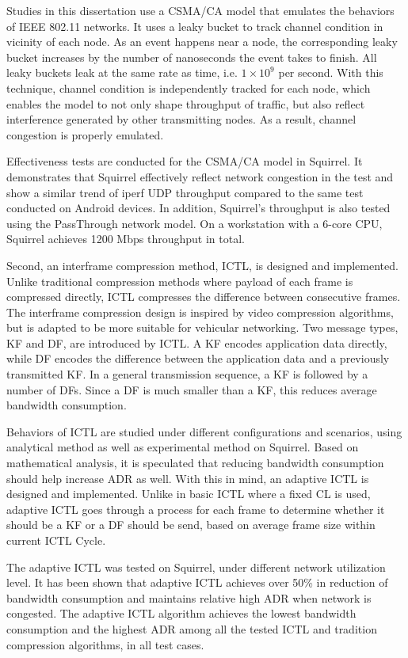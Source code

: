 \documentclass[12pt]{report}
\begin{document}
Studies in this dissertation use a CSMA/CA model that emulates the behaviors of IEEE 802.11 networks. It uses a leaky bucket to track channel condition in vicinity of each node. As an event happens near a node, the corresponding leaky bucket increases by the number of nanoseconds the event takes to finish. All leaky buckets leak at the same rate as time, i.e. $1\times 10^9$ per second. With this technique, channel condition is independently tracked for each node, which enables the model to not only shape throughput of traffic, but also reflect interference generated by other transmitting nodes. As a result, channel congestion is properly emulated.

Effectiveness tests are conducted for the CSMA/CA model in Squirrel. It demonstrates that Squirrel effectively reflect network congestion in the test and show a similar trend of iperf UDP throughput compared to the same test conducted on Android devices. In addition, Squirrel's throughput is also tested using the PassThrough network model. On a workstation with a 6-core CPU, Squirrel achieves 1200 Mbps throughput in total.

Second, an interframe compression method, ICTL, is designed and implemented. Unlike traditional compression methods where payload of each frame is compressed directly, ICTL compresses the difference between consecutive frames. The interframe compression design is inspired by video compression algorithms, but is adapted to be more suitable for vehicular networking. Two message types, KF and DF, are introduced by ICTL. A KF encodes application data directly, while DF encodes the difference between the application data and a previously transmitted KF. In a general transmission sequence, a KF is followed by a number of DFs. Since a DF is much smaller than a KF, this reduces average bandwidth consumption.

Behaviors of ICTL are studied under different configurations and scenarios, using analytical method as well as experimental method on Squirrel. Based on mathematical analysis, it is speculated that reducing bandwidth consumption should help increase ADR as well. With this in mind, an adaptive ICTL is designed and implemented. Unlike in basic ICTL where a fixed CL is used, adaptive ICTL goes through a process for each frame to determine whether it should be a KF or a DF should be send, based on average frame size within current ICTL Cycle.

The adaptive ICTL was tested on Squirrel, under different network utilization level. It has been shown that adaptive ICTL achieves over 50\% in reduction of bandwidth consumption and maintains relative high ADR when network is congested. The adaptive ICTL algorithm achieves the lowest bandwidth consumption and the highest ADR among all the tested ICTL and tradition compression algorithms, in all test cases.
\end{document}
